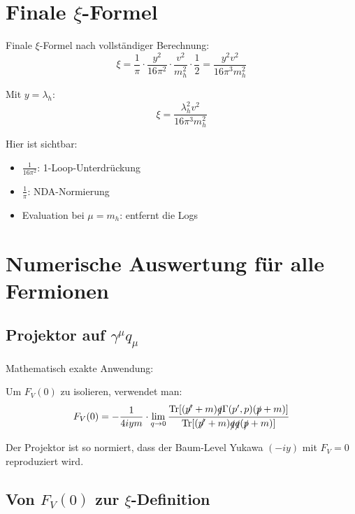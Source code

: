 	\section{Finale $\xi$-Formel}
	
	\begin{formel}
		Finale $\xi$-Formel nach vollständiger Berechnung:
		\begin{equation}
			\xi = \frac{1}{\pi} \cdot \frac{y^2}{16\pi^2} \cdot \frac{v^2}{m_h^2} \cdot \frac{1}{2} = \frac{y^2v^2}{16\pi^3m_h^2}
		\end{equation}
		
		Mit $y = \lambda_h$:
		\begin{equation}
			\boxed{\xi = \frac{\lambda_h^2v^2}{16\pi^3m_h^2}}
		\end{equation}
		
		Hier ist sichtbar:
		\begin{itemize}
			\item $\frac{1}{16\pi^2}$: 1-Loop-Unterdrückung
			\item $\frac{1}{\pi}$: NDA-Normierung
			\item Evaluation bei $\mu = m_h$: entfernt die Logs
		\end{itemize}
	\end{formel}
	
	\section{Numerische Auswertung für alle Fermionen}
	
	\subsection{Projektor auf $\gamma^\mu q_\mu$}
	
	Mathematisch exakte Anwendung:
	
	Um $F_V(0)$ zu isolieren, verwendet man:
	\begin{equation}
		F_V(0) = -\frac{1}{4iym} \cdot \lim_{q\to0} \frac{\text{Tr}[(\slashed{p'} + m)\slashed{q} \Gamma(p',p)(\slashed{p} + m)]}{\text{Tr}[(\slashed{p'} + m)\slashed{q}\slashed{q}(\slashed{p} + m)]}
	\end{equation}
	
	Der Projektor ist so normiert, dass der Baum-Level Yukawa $(-iy)$ mit $F_V = 0$ reproduziert wird.
	
	\subsection{Von $F_V(0)$ zur $\xi$-Definition}
	
